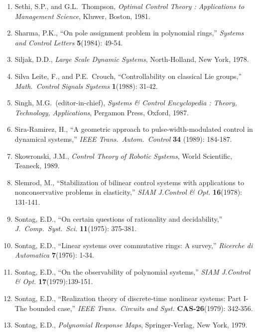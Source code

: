 \begin{enumerate}
\item
Sethi, S.P., and G.L.\ Thompson, {\it Optimal Control Theory : Applications to
Management Science}, Kluwer, Boston, 1981.

\item
Sharma, P.K., ``On pole assignment problem in polynomial rings,'' {\it Systems
and Control Letters} {\bf 5}(1984): 49-54.

\item
Siljak, D.D., {\it Large Scale Dynamic Systems}, North-Holland, New York,
1978.

\item
Silva Leite, F., and P.E.\ Crouch, ``Controllability on classical Lie
groups,'' {\it Math.\ Control Signals Systems} {\bf 1}(1988): 31-42.

\item
Singh, M.G.\ (editor-in-chief), {\it Systems \& Control Encyclopedia : Theory,
Technology, Applications}, Pergamon Press, Oxford, 1987.

\item
Sira-Ramirez, H., ``A geometric approach to pulse-width-modulated control in
dynamical systems,'' {\it IEEE Trans.\ Autom.\ Control} {\bf 34} (1989):
184-187.

\item
Skowronski, J.M., {\it Control Theory of Robotic Systems}, World Scientific,
Teaneck, 1989.

\item
Slemrod, M., ``Stabilization of bilinear control systems with applications to
nonconservative problems in elasticity,'' {\it SIAM J.Control \& Opt.} {\bf
16}(1978): 131-141.

\item
Sontag, E.D., ``On certain questions of rationality and decidability,'' {\it
J.\ Comp.\ Syst.\ Sci.} {\bf 11}(1975): 375-381.

\item
Sontag, E.D., ``Linear systems over commutative rings: A survey,'' {\it
Ricerche di Automatica} {\bf 7}(1976): 1-34.

\item
Sontag, E.D., ``On the observability of polynomial systems,'' {\it SIAM
J.Control \& Opt.} {\bf 17}(1979):139-151.

\item
Sontag, E.D., ``Realization theory of discrete-time nonlinear systems: Part I-
The bounded case,'' {\it IEEE Trans.\ Circuits and Syst.} {\bf CAS-26}(1979):
342-356.

\item
Sontag, E.D., {\it Polynomial Response Maps}, Springer-Verlag, New York, 1979.


\end{enumerate}
